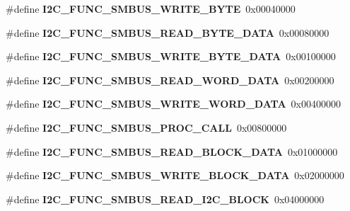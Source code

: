 \begin{DoxyCompactItemize}
\#define {\bfseries I2\+C\+\_\+\+F\+U\+N\+C\+\_\+\+S\+M\+B\+U\+S\+\_\+\+W\+R\+I\+T\+E\+\_\+\+B\+Y\+TE}~0x00040000
\item 
\mbox{\label{group__I2CLinux_ga5645b268c2303289fdf043c3a035bf8d}} 
\#define {\bfseries I2\+C\+\_\+\+F\+U\+N\+C\+\_\+\+S\+M\+B\+U\+S\+\_\+\+R\+E\+A\+D\+\_\+\+B\+Y\+T\+E\+\_\+\+D\+A\+TA}~0x00080000
\item 
\mbox{\label{group__I2CLinux_gac4186861a5c7f01d45e1f4ecba20334c}} 
\#define {\bfseries I2\+C\+\_\+\+F\+U\+N\+C\+\_\+\+S\+M\+B\+U\+S\+\_\+\+W\+R\+I\+T\+E\+\_\+\+B\+Y\+T\+E\+\_\+\+D\+A\+TA}~0x00100000
\item 
\mbox{\label{group__I2CLinux_ga1e313c48fbaba109e4b42b615c806459}} 
\#define {\bfseries I2\+C\+\_\+\+F\+U\+N\+C\+\_\+\+S\+M\+B\+U\+S\+\_\+\+R\+E\+A\+D\+\_\+\+W\+O\+R\+D\+\_\+\+D\+A\+TA}~0x00200000
\item 
\mbox{\label{group__I2CLinux_ga485634a989b0ace55940b8235785fcc5}} 
\#define {\bfseries I2\+C\+\_\+\+F\+U\+N\+C\+\_\+\+S\+M\+B\+U\+S\+\_\+\+W\+R\+I\+T\+E\+\_\+\+W\+O\+R\+D\+\_\+\+D\+A\+TA}~0x00400000
\item 
\mbox{\label{group__I2CLinux_ga86389b833643e6b1a050f6d4a7027873}} 
\#define {\bfseries I2\+C\+\_\+\+F\+U\+N\+C\+\_\+\+S\+M\+B\+U\+S\+\_\+\+P\+R\+O\+C\+\_\+\+C\+A\+LL}~0x00800000
\item 
\mbox{\label{group__I2CLinux_ga8a64d1f3b43e584549645386089fafe4}} 
\#define {\bfseries I2\+C\+\_\+\+F\+U\+N\+C\+\_\+\+S\+M\+B\+U\+S\+\_\+\+R\+E\+A\+D\+\_\+\+B\+L\+O\+C\+K\+\_\+\+D\+A\+TA}~0x01000000
\item 
\mbox{\label{group__I2CLinux_ga1f3f845fc6c212f6d54848cc71e752ab}} 
\#define {\bfseries I2\+C\+\_\+\+F\+U\+N\+C\+\_\+\+S\+M\+B\+U\+S\+\_\+\+W\+R\+I\+T\+E\+\_\+\+B\+L\+O\+C\+K\+\_\+\+D\+A\+TA}~0x02000000
\item 
\mbox{\label{group__I2CLinux_ga1e2efae197b3bcf4adb79b45065da621}} 
\#define {\bfseries I2\+C\+\_\+\+F\+U\+N\+C\+\_\+\+S\+M\+B\+U\+S\+\_\+\+R\+E\+A\+D\+\_\+\+I2\+C\+\_\+\+B\+L\+O\+CK}~0x04000000
\item 

\end{DoxyCompactItemize}
